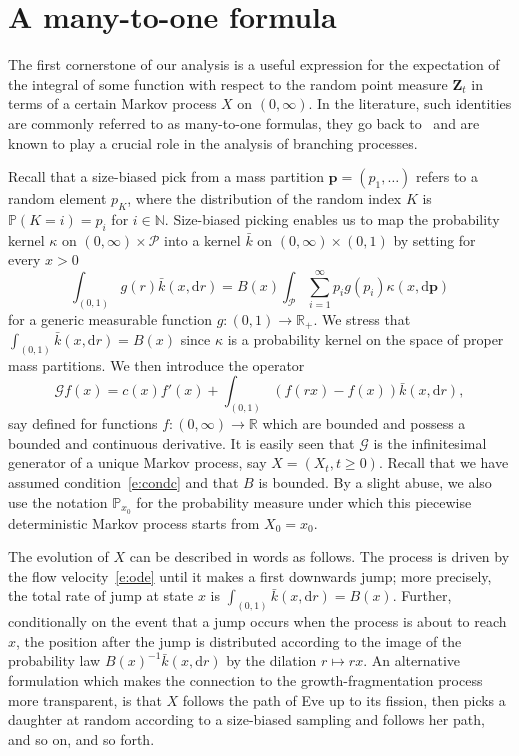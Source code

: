 \documentclass[11pt]{article}
\theoremstyle{definition}
\providecommand{\mathof}[1]{\mathrm{#1}}
\numberwithin{equation}{section}
\numberwithin{figure}{section}
\numberwithin{table}{section}
\newcommand\RR{\mathbb{R}}
\newcommand\Zz{\mathbf{Z}}
\newcommand\Pp{\mathcal{P}}
\newcommand\PP{\mathbb{P}}
\newcommand\from{\colon}
\newcommand\NN{\mathbb{N}}
\newcommand\pp{\mathbf{p}}
\newcommand\dd{\mathof{d}}
\begin{document}
\section{A many-to-one formula}\label{section3}

The first cornerstone of our analysis is a useful expression for the expectation of the integral of some function with respect to the random point measure $\Zz_t$ in terms of a certain Markov process $X$ on $(0,\infty)$. In the literature, such identities are commonly referred to as many-to-one formulas, they go back to~\cite{KaP, Pey} and are known to play a crucial role in the analysis of branching processes.

Recall that a size-biased pick from a mass partition $\pp=(p_1, \ldots)$ refers to a random element $p_K$, where the distribution of the random index $K$ is $\PP(K=i)=p_i$ for $i\in\NN$. Size-biased picking enables us to map the probability kernel $\kappa$ on $(0,\infty)\times \Pp$\label{s:kbar}
into a kernel $\bar k$ on $(0,\infty)\times (0,1)$ by setting for every $x>0$
\[
\int_{(0,1)} g(r)\bar k(x,\dd r)= {B}(x) \int_{\Pp} \sum_{i=1}^{\infty} p_ig(p_i) \kappa(x, \dd \pp)
\]
for a generic measurable function $g\from (0,1)\to \RR_+$. We stress that $\int_{(0,1)} \bar k(x,\dd r)= {B}(x)$ since $\kappa$ is a probability kernel on the space of proper mass partitions. We then introduce the operator
\[
{\mathcal G} f (x) = c(x) f'(x) +\int_{(0,1)} (f(rx) - f(x)) \bar k(x, \dd r),
\]
say defined for functions $f: (0,\infty)\to \RR$ which are bounded and possess a bounded and continuous derivative. It is easily seen that ${\mathcal G}$ is the infinitesimal generator of a unique Markov process, say $X=(X_t, t\geq 0)$. Recall that we have assumed condition~\eqref{e:condc} and that $B$ is bounded. By a slight abuse, we also use the notation $\PP_{x_0}$ for the probability measure under which this piecewise deterministic Markov process starts from $X_0=x_0$.

The evolution of $X$ can be described in words as follows. The process is driven by the flow velocity~\eqref{e:ode} until it makes a first downwards jump; more precisely, the total rate of jump at state $x$ is $\int_{(0,1)}\bar k(x,\dd r)={B}(x)$. Further, conditionally on the event that a jump occurs when the process is about to reach $x$, the position after the jump is distributed according to the image of the probability law ${B}(x)^{-1}\bar k(x, \dd r)$ by the dilation $r\mapsto rx$. An alternative formulation which makes the connection to the growth-fragmentation process more transparent, is that $X$ follows the path of Eve up to its fission, then picks a daughter at random according to a size-biased sampling and follows her path, and so on, and so forth.
\end{document}
